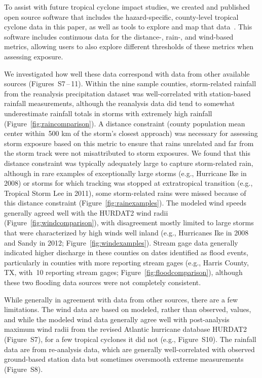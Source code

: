 To assist with future tropical cyclone impact studies, we created and published
open source software that includes the hazard-specific, county-level tropical
cyclone data in this paper, as well as tools to explore and map that 
data~\parencite{hurricaneexposure, hurricaneexposuredata}. This software includes continuous
data for the distance-, rain-, and wind-based metrics, allowing users to also explore
different thresholds of these metrics when assessing exposure.

We investigated how well these data correspond with data from other available
sources (Figures~S7\,--\,11). Within the nine sample
counties, storm-related rainfall from the reanalysis precipitation dataset was
well-correlated with station-based rainfall measurements, although the
reanalysis data did tend to somewhat underestimate rainfall totals in storms
with extremely high rainfall (Figure~\ref{fig:raincomparison}). A distance
constraint (county population mean center within~500 \si{\kilo\metre} of the
storm's closest approach) was necessary for assessing storm exposure based on
this metric to ensure that rains unrelated and far from the storm track were
not misattributed to storm exposures. We found that this distance constraint
was typically adequately large to capture storm-related rain, although in rare
examples of exceptionally large storms (e.g., Hurricane Ike in 2008) or storms
for which tracking was stopped at extratropical transition (e.g., Tropical
Storm Lee in 2011), some storm-related rains were missed because of this
distance constraint (Figure~\ref{fig:rainexamples}).  The modeled wind speeds
generally agreed well with the \ac{HURDAT2} wind radii
(Figure~\ref{fig:windcomparison}), with disagreement mostly limited to large
storms that were characterized by high winds well inland (e.g., Hurricanes Ike
in 2008 and Sandy in 2012; Figure~\ref{fig:windexamples}).  Stream gage data
generally indicated higher discharge in these counties on dates identified as
flood events, particularly in counties with more reporting stream gages (e.g.,
Harris County, TX, with~10 reporting stream gages;
Figure~\ref{fig:floodcomparison}), although these two flooding data sources
were not completely consistent.

While generally in agreement with data from other sources, there are a few
limitations. The wind data are based on modeled, rather than observed, values,
and while the modeled wind data generally agree well with post-analysis maximum
wind radii from the revised Atlantic hurricane database
\ac{HURDAT2}~\parencite{landsea2013} (Figure~S7), for a few
tropical cyclones it did not (e.g., Figure~S10). The
rainfall data are from re-analysis data, which are generally well-correlated
with observed ground-based station data but sometimes oversmooth extreme
measurements (Figure~S8). 
